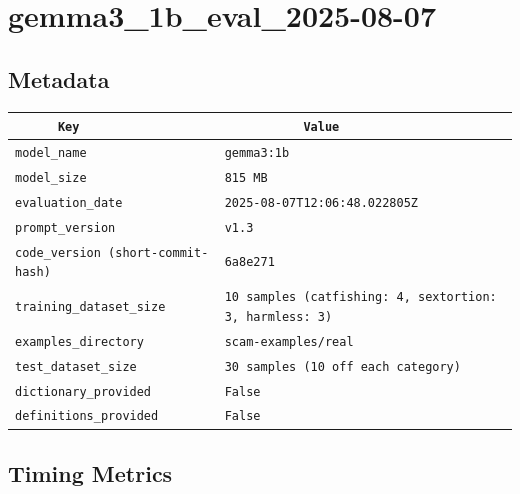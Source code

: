 \documentclass{article}
\begin{document}
\section{gemma3\_1b\_eval\_2025-08-07}
\subsection{Metadata}

\begin{center}
\begin{tabular}{l | l} \hline
    \verb|      Key      | & \verb|           Value           | \\ \hline
    \hline
    \verb|model_name    | & \verb|gemma3:1b                    | \\ \hline
    \verb|model_size    | & \verb|815 MB                       | \\ \hline
    \verb|evaluation_date| & \verb|2025-08-07T12:06:48.022805Z  | \\ \hline
    \verb|prompt_version| & \verb|v1.3                         | \\ \hline
    \verb|code_version (short-commit-hash)| & \verb|6a8e271                      | \\ \hline
    \verb|training_dataset_size| & \verb|10 samples (catfishing: 4, sextortion: 3, harmless: 3)| \\ \hline
    \verb|examples_directory| & \verb|scam-examples/real           | \\ \hline
    \verb|test_dataset_size| & \verb|30 samples (10 off each category)| \\ \hline
    \verb|dictionary_provided| & \verb|False                        | \\ \hline
    \verb|definitions_provided| & \verb|False                        | \\ \hline
\end{tabular}
\end{center}

\subsection{Timing Metrics}
\end{document}
